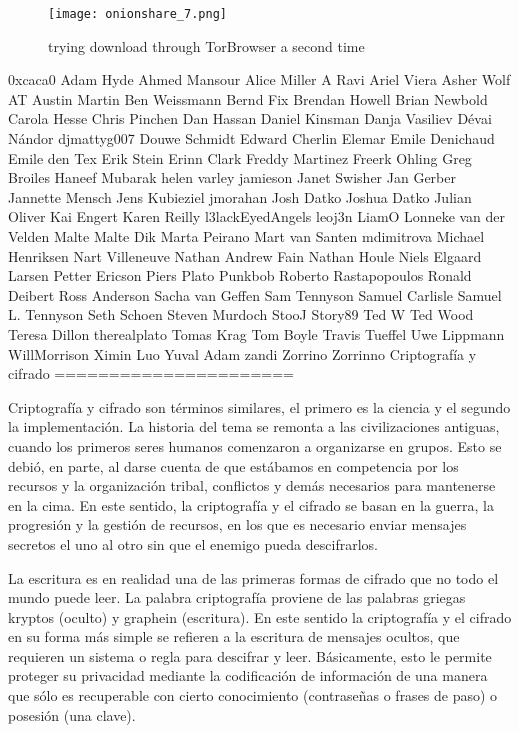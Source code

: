 \documentclass[10pt,a5paper,twoside,,]{book}
\begin{document}
\begin{figure}[htbp]
\centering
\texttt{[image: onionshare\_7.png]}
\caption{trying download through TorBrowser a second time}
\end{figure}

0xcaca0 Adam Hyde Ahmed Mansour Alice Miller A Ravi Ariel Viera Asher
Wolf AT Austin Martin Ben Weissmann Bernd Fix Brendan Howell Brian
Newbold Carola Hesse Chris Pinchen Dan Hassan Daniel Kinsman Danja
Vasiliev Dévai Nándor djmattyg007 Douwe Schmidt Edward Cherlin Elemar
Emile Denichaud Emile den Tex Erik Stein Erinn Clark Freddy Martinez
Freerk Ohling Greg Broiles Haneef Mubarak helen varley jamieson Janet
Swisher Jan Gerber Jannette Mensch Jens Kubieziel jmorahan Josh Datko
Joshua Datko Julian Oliver Kai Engert Karen Reilly l3lackEyedAngels
leoj3n LiamO Lonneke van der Velden Malte Malte Dik Marta Peirano Mart
van Santen mdimitrova Michael Henriksen Nart Villeneuve Nathan Andrew
Fain Nathan Houle Niels Elgaard Larsen Petter Ericson Piers Plato
Punkbob Roberto Rastapopoulos Ronald Deibert Ross Anderson Sacha van
Geffen Sam Tennyson Samuel Carlisle Samuel L. Tennyson Seth Schoen
Steven Murdoch StooJ Story89 Ted W Ted Wood Teresa Dillon therealplato
Tomas Krag Tom Boyle Travis Tueffel Uwe Lippmann WillMorrison Ximin Luo
Yuval Adam zandi Zorrino Zorrinno Criptografía y cifrado
======================

Criptografía y cifrado son términos similares, el primero es la ciencia
y el segundo la implementación. La historia del tema se remonta a las
civilizaciones antiguas, cuando los primeros seres humanos comenzaron a
organizarse en grupos. Esto se debió, en parte, al darse cuenta de que
estábamos en competencia por los recursos y la organización tribal,
conflictos y demás necesarios para mantenerse en la cima. En este
sentido, la criptografía y el cifrado se basan en la guerra, la
progresión y la gestión de recursos, en los que es necesario enviar
mensajes secretos el uno al otro sin que el enemigo pueda descifrarlos.

La escritura es en realidad una de las primeras formas de cifrado que no
todo el mundo puede leer. La palabra criptografía proviene de las
palabras griegas kryptos (oculto) y graphein (escritura). En este
sentido la criptografía y el cifrado en su forma más simple se refieren
a la escritura de mensajes ocultos, que requieren un sistema o regla
para descifrar y leer. Básicamente, esto le permite proteger su
privacidad mediante la codificación de información de una manera que
sólo es recuperable con cierto conocimiento (contraseñas o frases de
paso) o posesión (una clave).
\end{document}
